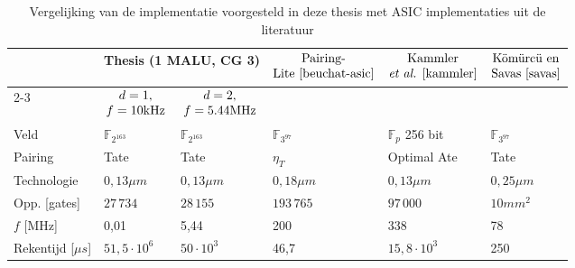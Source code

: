 \begin{table}[h]
	\caption{Vergelijking van de implementatie voorgesteld in deze thesis met ASIC implementaties uit de literatuur}
	\label{tabel-resultaten-asic}

	\begin{narrow}{-2cm}{-2cm}
		\centering
		\begin{tabular}{llllll}
			\toprule
			&	\multicolumn{2}{c}{Thesis (1 MALU, CG 3)}	& \multirow{3}{*}{$\begin{array}{@{}c@{}}\text{Pairing-}\\\text{Lite \cite{beuchat-asic}}\end{array}$}	& \multicolumn{1}{c}{\multirow{3}{*}{$\begin{array}{@{}c@{}}\text{Kammler}\\\text{\emph{et al.} \cite{kammler}}\end{array}$}}	&  \multicolumn{1}{c}{\multirow{3}{*}{$\begin{array}{@{}c@{}}\text{K\"om\"urc\"u en}\\\text{Savas \cite{savas}}\end{array}$}}\\
			\cmidrule(r){2-3}
			& \multicolumn{1}{c}{$\begin{array}{@{}c@{}}d = 1,\\f = 10\text{kHz}\end{array}$} & \multicolumn{1}{c}{$\begin{array}{@{}c@{}}d = 2,\\f = 5.44\text{MHz}\end{array}$} & & &\\
	 		\midrule
			Veld																				& $\mathbb{F}_{2^{163}}$	& $\mathbb{F}_{2^{163}}$	& $\mathbb{F}_{3^{97}}$	& $\mathbb{F}_{p}$ 256 bit	& $\mathbb{F}_{3^{97}}$ \\
			Pairing																			& Tate							& Tate							& $\eta_T$					& Optimal Ate 					& Tate\\
			Technologie																		& $0,13 \mu m$					& $0,13 \mu m$					& $0,18 \mu m$				& $0,13 \mu m$					& $0,25 \mu m$\\
			Opp. [gates]																	& $27\,734$						& $28\,155$						& $193\,765$				& $97\,000$						& \emph{$10mm^2$}\footnotemark[2]\\
			$f$ [MHz]																		& 0,01							& 5,44							& 200							& 338								& 78\\
			Rekentijd [$\mu s$]															& $51,5 \cdot 10^6$			& $50 \cdot 10^3$				& 46,7						& $15,8 \cdot 10^3$			& 250\footnotemark[3]\\

\end{tabular}
\end{narrow}
\end{table}
